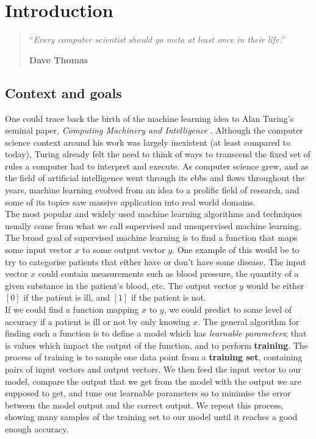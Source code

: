 \chapter{Introduction}
\setcounter{page}{1}
\begin{quotation}
\noindent ``\emph{Every computer scientist should go meta at least once in
	their life.}''
\begin{flushright}\textbf{Dave Thomas}\end{flushright}
\end{quotation}

\vspace*{0.5cm}

\section{Context and goals}
One could trace back the birth of the machine learning idea to Alan Turing's 
seminal paper, \textit{Computing Machinery and Intelligence} 
\cite{turing1950computing}. Although the computer science context around his
work was largely inexistent (at least compared to today), Turing already felt
the need to think of ways to transcend the fixed set of rules a computer had
to interpret and execute. As computer science grew, and as the field of
artificial intelligence went through its ebbs and flows throughout the years,
machine learning evolved from an idea to a prolific field of research, and
some of its topics saw massive application into real world domains.\\

The most popular and widely used machine learning algorithms and techniques
usually come from what we call supervised and unsupervised machine learning.
The broad goal of supervised machine learning is to find a function that maps
some input vector $x$ to some output vector $y$. One example of this would be
to try to categorise patients that either have or don't have some disease. 
The input vector $x$ could contain measurements such as blood pressure, the 
quantity of a given substance in the patient's blood, etc. The output vector
$y$ would be either $[0]$ if the patient is ill, and $[1]$ if the patient is
not.\\

If we could find a function mapping $x$ to $y$, we could predict to some
level of accuracy if a patient is ill or not by only knowing $x$. The general
algorithm for finding such a function is to define a model which has
\textit{learnable parameters}; that is values which impact the output of the
function, and to perform \textbf{training}. The process of training is to
sample one data point from a \textbf{training set}, containing pairs of input
vectors and output vectors. We then feed the input vector to our model, compare
the output that we get from the model with the output we are supposed to get,
and tune our learnable parameters so to minimise the error between the model
output and the correct output. We repeat this process, showing many samples
of the training set to our model until it reaches a good enough accuracy.

